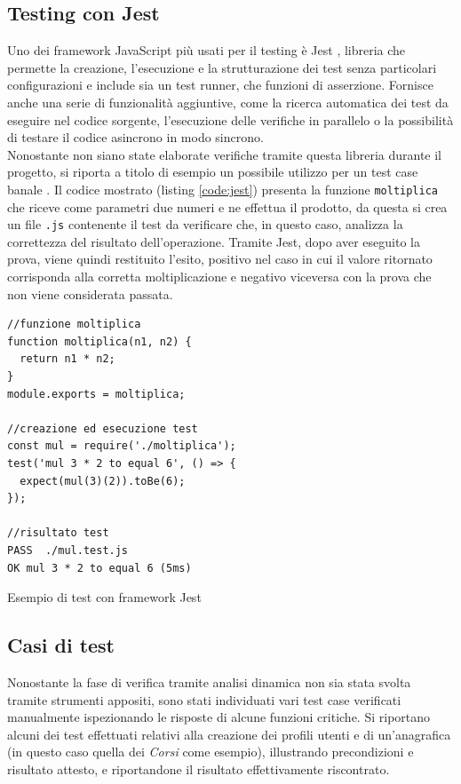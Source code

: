 \subsection{Testing con Jest}
\label{sec:jest}
Uno dei framework JavaScript più usati per il testing è Jest \cite{jest}, libreria che permette la creazione, l'esecuzione e la strutturazione dei test senza particolari configurazioni e include sia un test runner, che funzioni di asserzione. Fornisce anche una serie di funzionalità aggiuntive, come la ricerca automatica dei test da eseguire nel codice sorgente, l'esecuzione delle verifiche in parallelo o la possibilità di testare il codice asincrono in modo sincrono.\\
\newline
Nonostante non siano state elaborate verifiche tramite questa libreria durante il progetto, si riporta a titolo di esempio un possibile utilizzo per un test case banale \cite{jest_ex}. Il codice mostrato (listing \ref{code:jest}) presenta la funzione \verb|moltiplica| che riceve come parametri due numeri e ne effettua il prodotto, da questa si crea un file \verb|.js| contenente il test da verificare che, in questo caso, analizza la correttezza del risultato dell'operazione. Tramite Jest, dopo aver eseguito la prova, viene quindi restituito l'esito, positivo nel caso in cui il valore ritornato corrisponda alla corretta moltiplicazione e negativo viceversa con la prova che non viene considerata passata.

\begin{listing}[!hbt]
\begin{verbatim}
//funzione moltiplica
function moltiplica(n1, n2) {
  return n1 * n2;
}
module.exports = moltiplica;

//creazione ed esecuzione test
const mul = require('./moltiplica');
test('mul 3 * 2 to equal 6', () => {
  expect(mul(3)(2)).toBe(6);
});

//risultato test
PASS  ./mul.test.js
OK mul 3 * 2 to equal 6 (5ms)
\end{verbatim}
\caption{Esempio di test con framework Jest}
\label{code:jest}
\end{listing}
\noindent



\subsection{Casi di test}
\label{sec:casi} 
Nonostante la fase di verifica tramite analisi dinamica non sia stata svolta tramite strumenti appositi, sono stati individuati vari test case verificati manualmente ispezionando le risposte di alcune funzioni critiche. Si riportano alcuni dei test effettuati relativi alla creazione dei profili utenti e di un'anagrafica (in questo caso quella dei \textit{Corsi} come esempio), illustrando precondizioni e risultato attesto, e riportandone il risultato effettivamente riscontrato.

